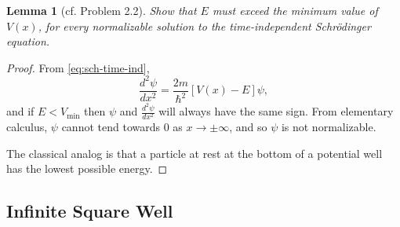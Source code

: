 \documentclass{article}
\newtheorem*{lemma*}{Lemma}
\begin{document}
\begin{lemma*}[cf. Problem 2.2]
  Show that $E$ must exceed the minimum value of $V(x)$, for every normalizable
  solution to the time-independent Schr\"{o}dinger equation.
\end{lemma*}
\begin{proof}
  From \eqref{eq:sch-time-ind}, \[
    \frac{d^2\psi}{dx^2} = \frac{2m}{\hbar^2}[V(x) - E]\psi,
  \] and if $E < V_\text{min}$ then $\psi$ and $\frac{d^2\psi}{dx^2}$ will
  always have the same sign. From elementary calculus, $\psi$ cannot tend
  towards 0 as $x \to \pm\infty$, and so $\psi$ is not normalizable.

  The classical analog is that a particle at rest at the bottom of a potential
  well has the lowest possible energy.
\end{proof}

\subsection{Infinite Square Well}
\end{document}
